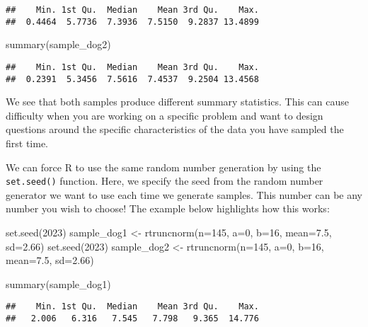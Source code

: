 \documentclass[
]{book}
\newenvironment{Shaded}{\begin{snugshade}}{\end{snugshade}}
\newcommand{\AttributeTok}[1]{\textcolor[rgb]{0.77,0.63,0.00}{#1}}
\newcommand{\DecValTok}[1]{\textcolor[rgb]{0.00,0.00,0.81}{#1}}
\newcommand{\FloatTok}[1]{\textcolor[rgb]{0.00,0.00,0.81}{#1}}
\newcommand{\FunctionTok}[1]{\textcolor[rgb]{0.00,0.00,0.00}{#1}}
\newcommand{\NormalTok}[1]{#1}
\newcommand{\OtherTok}[1]{\textcolor[rgb]{0.56,0.35,0.01}{#1}}
\begin{document}
\begin{verbatim}
##    Min. 1st Qu.  Median    Mean 3rd Qu.    Max. 
##  0.4464  5.7736  7.3936  7.5150  9.2837 13.4899
\end{verbatim}

\begin{Shaded}
\begin{Highlighting}[]
\FunctionTok{summary}\NormalTok{(sample\_dog2)}
\end{Highlighting}
\end{Shaded}

\begin{verbatim}
##    Min. 1st Qu.  Median    Mean 3rd Qu.    Max. 
##  0.2391  5.3456  7.5616  7.4537  9.2504 13.4568
\end{verbatim}

We see that both samples produce different summary statistics. This can cause difficulty when you are working on a specific problem and want to design questions around the specific characteristics of the data you have sampled the first time.

We can force R to use the same random number generation by using the \texttt{set.seed()} function. Here, we specify the seed from the random number generator we want to use each time we generate samples. This number can be any number you wish to choose! The example below highlights how this works:

\begin{Shaded}
\begin{Highlighting}[]
\FunctionTok{set.seed}\NormalTok{(}\DecValTok{2023}\NormalTok{)}
\NormalTok{sample\_dog1 }\OtherTok{\textless{}{-}} \FunctionTok{rtruncnorm}\NormalTok{(}\AttributeTok{n=}\DecValTok{145}\NormalTok{, }\AttributeTok{a=}\DecValTok{0}\NormalTok{, }\AttributeTok{b=}\DecValTok{16}\NormalTok{, }\AttributeTok{mean=}\FloatTok{7.5}\NormalTok{, }\AttributeTok{sd=}\FloatTok{2.66}\NormalTok{)}
\FunctionTok{set.seed}\NormalTok{(}\DecValTok{2023}\NormalTok{)}
\NormalTok{sample\_dog2 }\OtherTok{\textless{}{-}} \FunctionTok{rtruncnorm}\NormalTok{(}\AttributeTok{n=}\DecValTok{145}\NormalTok{, }\AttributeTok{a=}\DecValTok{0}\NormalTok{, }\AttributeTok{b=}\DecValTok{16}\NormalTok{, }\AttributeTok{mean=}\FloatTok{7.5}\NormalTok{, }\AttributeTok{sd=}\FloatTok{2.66}\NormalTok{)}

\FunctionTok{summary}\NormalTok{(sample\_dog1)}
\end{Highlighting}
\end{Shaded}

\begin{verbatim}
##    Min. 1st Qu.  Median    Mean 3rd Qu.    Max. 
##   2.006   6.316   7.545   7.798   9.365  14.776
\end{verbatim}
\end{document}
